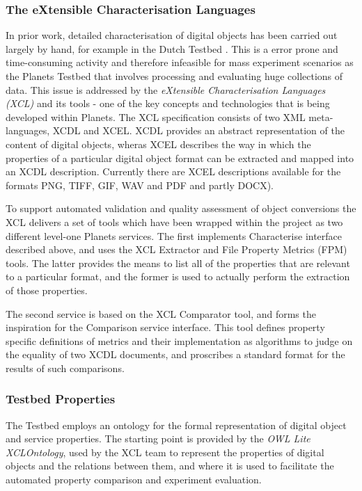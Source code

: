 \documentclass{article}
\begin{document}
\subsubsection{The eXtensible Characterisation Languages}
\label{xcl}
In prior work, detailed characterisation of digital objects has been carried out
largely by hand, for example in the Dutch Testbed \cite{potter-2002}. This is a
error prone and time-consuming activity and therefore infeasible for mass
experiment scenarios as the Planets Testbed that involves processing and
evaluating huge collections of data. This issue is addressed by the
\emph{eXtensible Characterisation Languages (XCL)} \cite{xcl2008} and its tools -
one of the key concepts and technologies that is being developed within Planets.
The XCL specification \cite{std-xcl} consists of two XML meta-languages, XCDL and
XCEL. XCDL provides an abstract representation of the content of digital objects,
wheras XCEL describes the way in which the properties of a particular digital
object format can be extracted and mapped into an XCDL description. Currently
there are XCEL descriptions available for the formats PNG, TIFF, GIF, WAV and PDF
and partly DOCX).

To support automated validation and quality assessment of object conversions the
XCL delivers a set of tools \cite{becker-xcdl} which have been wrapped within the
project as two different level-one Planets services. The first implements
Characterise interface described above, and uses the XCL Extractor and File
Property Metrics (FPM) tools.  The latter provides the means to list all of the
properties that are relevant to a particular format, and the former is used to
actually perform the extraction of those properties.

The second service is based on the XCL Comparator tool, and forms the inspiration
for the Comparison service interface. This tool defines property specific
definitions of metrics and their implementation as algorithms to judge on the
equality of two XCDL documents, and proscribes a standard format for the results
of such comparisons.

\subsubsection{Testbed Properties}
\label{ss-planprop}
The Testbed employs an ontology for the formal representation of digital object
and service properties. The starting point is provided by the \emph{OWL Lite}
\cite{w3c-owl-ref} \emph{XCLOntology}, used by the XCL team to represent the
properties of digital objects and the relations between them, and where it is
used to facilitate the automated property comparison and experiment evaluation.
\end{document}
